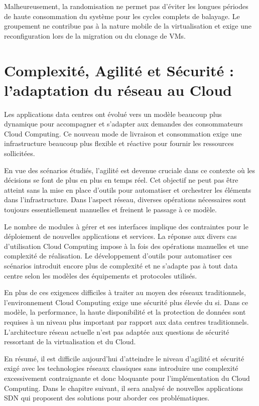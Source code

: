Malheureusement, la randomisation ne permet pas d'éviter les longues périodes de haute consommation du système pour les cycles complets de balayage. Le groupement ne contribue pas à la nature mobile de la virtualisation et exige une reconfiguration lors de la migration ou du clonage de VMs. 

 \cite{hpAlcatelCreatinCloudDCchallenges} \cite{cloudSecurityThreats}


\section{Complexité, Agilité et Sécurité : l'adaptation du réseau au Cloud}

Les applications data centres ont évolué vers un modèle beaucoup plus dynamique pour accompagner et s'adapter aux demandes des consommateurs Cloud Computing. Ce nouveau mode de livraison et consommation exige une infrastructure beaucoup plus flexible et réactive pour fournir les ressources sollicitées. 

En vue des scénarios étudiés, l'agilité est devenue cruciale dans ce contexte où les décisions se font de plus en plus en temps réel. Cet objectif ne peut pas être atteint sans la mise en place d'outils pour automatiser et orchestrer les éléments dans l'infrastructure. Dans l'aspect réseau, diverses opérations nécessaires sont toujours essentiellement manuelles et freinent le passage à ce modèle.

Le nombre de modules à gérer et ses interfaces implique des contraintes pour le déploiement de nouvelles applications et services. La réponse aux divers cas d'utilisation Cloud Computing impose à la fois des opérations manuelles et une complexité de réalisation. Le développement d'outils pour automatiser ces scénarios introduit encore plus de complexité et ne s'adapte pas à tout data centre selon les modèles des équipements et protocoles utilisés.

En plus de ces exigences difficiles à traiter au moyen des réseaux traditionnels, l'environnement Cloud Computing exige une sécurité plus élevée du \gls{si}. Dans ce modèle, la performance, la haute disponibilité et la protection de données sont requises à un niveau plus important par rapport aux data centres traditionnels. L'architecture réseau actuelle n'est pas adaptée aux questions de sécurité ressortant de la virtualisation et du Cloud.

En résumé, il est difficile aujourd'hui d'atteindre le niveau d'agilité et sécurité exigé avec les technologies réseaux classiques sans introduire une complexité excessivement contraignante et donc bloquante pour l'implémentation du Cloud Computing. Dans le chapitre suivant, il sera analysé de nouvelles applications SDN qui proposent des solutions pour aborder ces problématiques. 